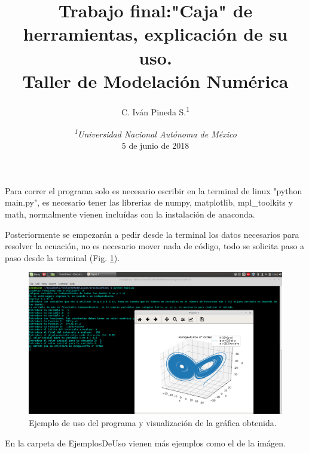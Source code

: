 \documentclass[12pt,letterpaper]{article}
\author{C. Iván Pineda S.\textsuperscript{1} }
\title{Trabajo final:"Caja" de herramientas, explicación de su uso.\\ Taller de Modelación Numérica}
\date {\textit{\textsuperscript{1}Universidad Nacional Autónoma de México}
\\ 5 de junio de 2018}
\begin{document}
\maketitle

Para correr el programa solo es necesario escribir en la terminal de linux  "python main.py", es necesario tener las librerias de numpy, matplotlib, mpl\_toolkits y math, normalmente vienen incluídas con la instalación de anaconda.

Posteriormente se empezarán a pedir desde la terminal los datos necesarios para resolver la ecuación, no es necesario mover nada de código, todo se solicita paso a paso desde la terminal (Fig. \ref{fig:ejemplo}).

\begin{figure}[H]
	\begin{center}
		\includegraphics[scale=0.36]{3drk} 
	\end{center}
	\caption{Ejemplo de uso del programa y visualización de la gráfica obtenida.}
	\label{fig:ejemplo}
\end{figure}

En la carpeta de EjemplosDeUso vienen más ejemplos como el de la imágen.
\end{document}
